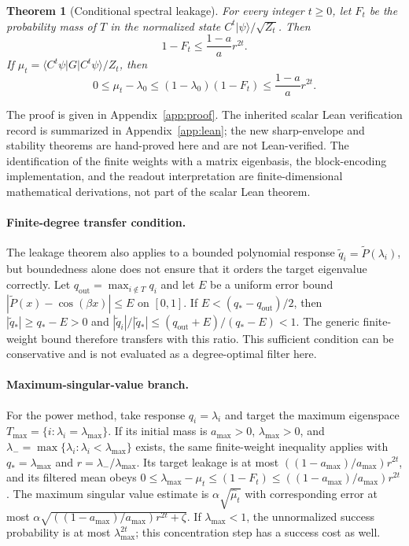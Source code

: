 \documentclass[11pt]{article}
\newtheorem{theorem}{Theorem}
\newcommand{\ket}[1]{\lvert #1\rangle}
\begin{document}
\begin{theorem}[Conditional spectral leakage]
For every integer $t\geq0$, let $F_t$ be the probability mass of $T$ in the normalized state $C^t\ket{\psi}/\sqrt{Z_t}$. Then
\[
 1-F_t\leq\frac{1-a}{a}r^{2t}.
\]
If $\mu_t=\langle C^t\psi|G|C^t\psi\rangle/Z_t$, then
\[
 0\leq\mu_t-\lambda_0
 \leq(1-\lambda_0)(1-F_t)
 \leq\frac{1-a}{a}r^{2t}.
\]
\end{theorem}

\noindent The proof is given in Appendix~\ref{app:proof}. The inherited scalar Lean verification record is summarized in Appendix~\ref{app:lean}; the new sharp-envelope and stability theorems are hand-proved here and are not Lean-verified. The identification of the finite weights with a matrix eigenbasis, the block-encoding implementation, and the readout interpretation are finite-dimensional mathematical derivations, not part of the scalar Lean theorem.

\paragraph{Finite-degree transfer condition.}
The leakage theorem also applies to a bounded polynomial response $\widetilde q_i=\widetilde P(\lambda_i)$, but boundedness alone does not ensure that it orders the target eigenvalue correctly. Let $q_{\mathrm{out}}=\max_{i\notin T}q_i$ and let $E$ be a uniform error bound $|\widetilde P(x)-\cos(\beta x)|\leq E$ on $[0,1]$. If $E<(q_*-q_{\mathrm{out}})/2$, then $|\widetilde q_*|\geq q_*-E>0$ and $|\widetilde q_i|/|\widetilde q_*|\leq(q_{\mathrm{out}}+E)/(q_*-E)<1$. The generic finite-weight bound therefore transfers with this ratio. This sufficient condition can be conservative and is not evaluated as a degree-optimal filter here.

\paragraph{Maximum-singular-value branch.}
For the power method, take response $q_i=\lambda_i$ and target the maximum eigenspace $T_{\max}=\{i:\lambda_i=\lambda_{\max}\}$. If its initial mass is $a_{\max}>0$, $\lambda_{\max}>0$, and $\lambda_-=\max\{\lambda_i:\lambda_i<\lambda_{\max}\}$ exists, the same finite-weight inequality applies with $q_*=\lambda_{\max}$ and $r=\lambda_-/\lambda_{\max}$. Its target leakage is at most $((1-a_{\max})/a_{\max})r^{2t}$, and its filtered mean obeys $0\leq\lambda_{\max}-\mu_t\leq(1-F_t)\leq((1-a_{\max})/a_{\max})r^{2t}$. The maximum singular value estimate is $\alpha\sqrt{\widehat\mu_t}$ with corresponding error at most $\alpha\sqrt{((1-a_{\max})/a_{\max})r^{2t}+\zeta}$. If $\lambda_{\max}<1$, the unnormalized success probability is at most $\lambda_{\max}^{2t}$; this concentration step has a success cost as well.
\end{document}
